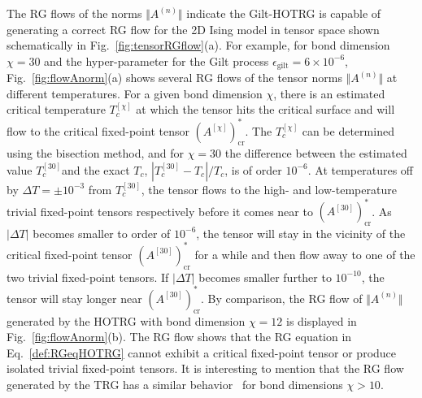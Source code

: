 \documentclass[aps,prb,reprint,superscriptaddress]{revtex4-2}
\begin{document}
The RG flows of the norms $\Vert A^{(n)} \Vert$ indicate the Gilt-HOTRG is
capable of generating a correct RG flow for the 2D Ising model in tensor
space shown schematically in Fig.~\ref{fig:tensorRGflow}(a). For example,
for bond dimension $\chi = 30$ and the hyper-parameter for the Gilt process
$\epsilon_{\text{gilt}} = 6\times 10^{-6}$, Fig.~\ref{fig:flowAnorm}(a)
shows several RG flows of the tensor norms $\Vert A^{(n)} \Vert$ at
different temperatures. For a given bond dimension $\chi$, there is an
estimated critical
temperature $T_c^{[\chi]}$ at which the tensor
hits the critical surface and will flow to the critical fixed-point
tensor $(A^{[\chi]})^*_{\text{cr}}$. The $T_c^{[\chi]}$ can be determined
using the bisection method, and for $\chi = 30$ the difference between
the estimated value $T_c^{[30]}$and the exact $T_c$, $|T_c^{[30]} - T_c|
/ T_c$, is of order $10^{-6}$. At temperatures off by $\Delta T = \pm 10^{-3}$
from $T_c^{[30]}$, the tensor flows to the high- and
low-temperature trivial fixed-point tensors respectively before it comes
near to $(A^{[30]})^*_{\text{cr}}$. As $|\Delta T|$ becomes smaller to
order of $10^{-6}$, the tensor will stay in the vicinity of the critical
fixed-point tensor $(A^{[30]})^*_{\text{cr}}$ for a while and then flow
away to one of the two trivial fixed-point tensors. If $|\Delta T|$
becomes smaller further to $10^{-10}$, the tensor
will stay longer near $(A^{[30]})^*_{\text{cr}}$. By comparison, the
RG flow of $\Vert A^{(n)}\Vert$ generated by the HOTRG with bond
dimension $\chi = 12$ is displayed in Fig.~\ref{fig:flowAnorm}(b). The RG
flow shows that the RG equation in Eq.~\eqref{def:RGeqHOTRG} cannot
exhibit a
critical fixed-point tensor or produce isolated trivial fixed-point
tensors. It is interesting to mention that the RG flow generated by the
TRG has a similar behavior~\cite{Berker2008} for bond
dimensions $\chi > 10$.
\end{document}
